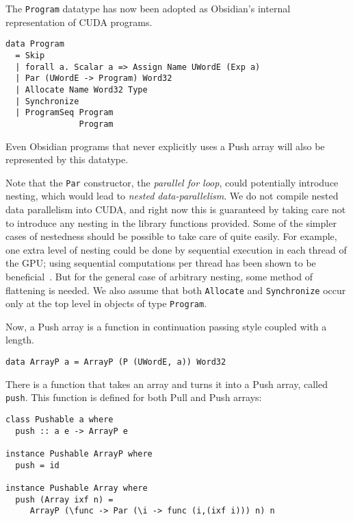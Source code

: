 The {\tt Program} datatype has now been adopted as Obsidian's internal 
representation of CUDA programs.

\begin{codesize}
\begin{verbatim}
data Program
  = Skip
  | forall a. Scalar a => Assign Name UWordE (Exp a) 
  | Par (UWordE -> Program) Word32   
  | Allocate Name Word32 Type 
  | Synchronize 
  | ProgramSeq Program 
               Program 
\end{verbatim}
\end{codesize}

\noindent
Even Obsidian programs 
that never explicitly uses a Push array will also be represented by this 
datatype. 

Note that the {\tt Par} constructor, 
the {\em parallel for loop}, could potentially introduce nesting, which would lead 
to {\em nested data-parallelism}. We do not compile nested data parallelism 
into CUDA, and right now this is guaranteed by taking care not to introduce 
any nesting in the library functions provided. Some of the 
simpler cases of nestedness should be possible to take care of quite easily. 
For example, one extra level of nesting could be done by sequential execution 
in each thread of the GPU; using sequential computations per thread has 
been shown to be beneficial~. But for the general case 
of arbitrary nesting, some method of flattening is needed. 
We also assume that both {\tt Allocate} and {\tt Synchronize} occur only at the top level in objects of type {\tt Program}. 

Now, a Push array is a function in continuation passing style
coupled with a length. 

\begin{codesize}
\begin{verbatim}
data ArrayP a = ArrayP (P (UWordE, a)) Word32
\end{verbatim}
\end{codesize}


There is a function that takes an array and turns it into a Push array, 
called {\tt push}. This function is defined for both Pull and Push arrays: 

\begin{codesize}
\begin{verbatim} 
class Pushable a where 
  push :: a e -> ArrayP e 

instance Pushable ArrayP where 
  push = id 
  
instance Pushable Array where   
  push (Array ixf n) =
     ArrayP (\func -> Par (\i -> func (i,(ixf i))) n) n 
\end{verbatim}
\end{codesize}

